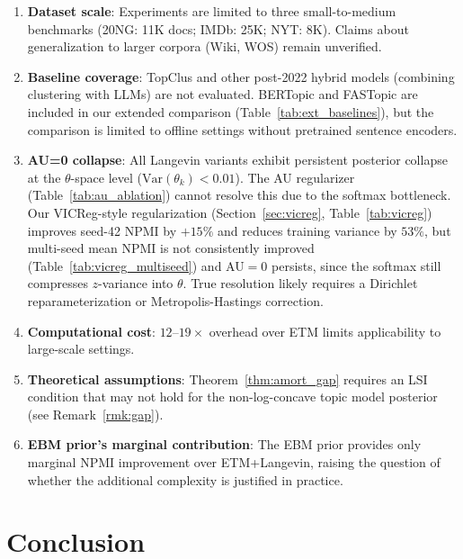 \documentclass[10pt]{article}
\begin{document}
\begin{enumerate}
    \item \textbf{Dataset scale}: Experiments are limited to three small-to-medium benchmarks
    (20NG: 11K docs; IMDb: 25K; NYT: 8K). Claims about generalization to larger corpora
    (Wiki, WOS) remain unverified.

    \item \textbf{Baseline coverage}: TopClus and other post-2022 hybrid models
    (combining clustering with LLMs) are not evaluated. BERTopic and FASTopic are
    included in our extended comparison (Table~\ref{tab:ext_baselines}), but the
    comparison is limited to offline settings without pretrained sentence encoders.

    \item \textbf{AU=0 collapse}: All Langevin variants exhibit persistent posterior
    collapse at the $\theta$-space level ($\mathrm{Var}(\theta_k) < 0.01$). The AU regularizer
    (Table~\ref{tab:au_ablation}) cannot resolve this due to the softmax bottleneck.
    Our VICReg-style regularization (Section~\ref{sec:vicreg}, Table~\ref{tab:vicreg})
    improves seed-42 NPMI by $+15\%$ and reduces training variance by $53\%$,
    but multi-seed mean NPMI is not consistently improved (Table~\ref{tab:vicreg_multiseed})
    and AU$=0$ persists, since the softmax still compresses $z$-variance into $\theta$.
    True resolution likely requires a Dirichlet reparameterization or Metropolis-Hastings correction.

    \item \textbf{Computational cost}: $12$--$19\times$ overhead over ETM limits
    applicability to large-scale settings.

    \item \textbf{Theoretical assumptions}: Theorem~\ref{thm:amort_gap} requires an LSI
    condition that may not hold for the non-log-concave topic model posterior
    (see Remark~\ref{rmk:gap}).

    \item \textbf{EBM prior's marginal contribution}: The EBM prior provides
    only marginal NPMI improvement over ETM+Langevin, raising the question of whether
    the additional complexity is justified in practice.
\end{enumerate}

\section{Conclusion}
\label{sec:conclusion}
\end{document}
